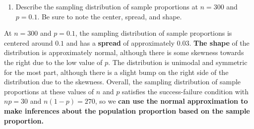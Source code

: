 \documentclass[
]{article}
\newenvironment{Shaded}{\begin{snugshade}}{\end{snugshade}}
\newcommand{\AttributeTok}[1]{\textcolor[rgb]{0.77,0.63,0.00}{#1}}
\newcommand{\ConstantTok}[1]{\textcolor[rgb]{0.00,0.00,0.00}{#1}}
\newcommand{\ControlFlowTok}[1]{\textcolor[rgb]{0.13,0.29,0.53}{\textbf{#1}}}
\newcommand{\DecValTok}[1]{\textcolor[rgb]{0.00,0.00,0.81}{#1}}
\newcommand{\FloatTok}[1]{\textcolor[rgb]{0.00,0.00,0.81}{#1}}
\newcommand{\FunctionTok}[1]{\textcolor[rgb]{0.00,0.00,0.00}{#1}}
\newcommand{\NormalTok}[1]{#1}
\newcommand{\OtherTok}[1]{\textcolor[rgb]{0.56,0.35,0.01}{#1}}
\newcommand{\SpecialCharTok}[1]{\textcolor[rgb]{0.00,0.00,0.00}{#1}}
\newcommand{\StringTok}[1]{\textcolor[rgb]{0.31,0.60,0.02}{#1}}
\providecommand{\tightlist}{%
  \setlength{\itemsep}{0pt}\setlength{\parskip}{0pt}}
\begin{document}
\begin{enumerate}
\def\labelenumi{\arabic{enumi}.}
\setcounter{enumi}{5}
\tightlist
\item
  Describe the sampling distribution of sample proportions at
  \(n = 300\) and \(p = 0.1\). Be sure to note the center, spread, and
  shape.
\end{enumerate}

At \(n=300\) and \(p=0.1\), the sampling distribution of sample
proportions is centered around \(0.1\) and has a \textbf{spread} of
approximately \(0.03\). \textbf{The shape} of the distribution is
approximately normal, although there is some skewness towards the right
due to the low value of \(p\). The distribution is unimodal and
symmetric for the most part, although there is a slight bump on the
right side of the distribution due to the skewness. Overall, the
sampling distribution of sample proportions at these values of \(n\) and
\(p\) satisfies the success-failure condition with \(np=30\) and
\(n(1-p)=270\), so we \textbf{can use the normal approximation to make
inferences about the population proportion based on the sample
proportion.}

\begin{Shaded}
\end{Shaded}
\end{document}
